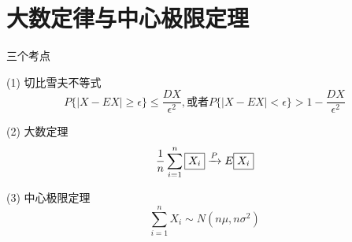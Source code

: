 \documentclass[12pt, a4paper, oneside, UTF8]{ctexbook}
\begin{document}
% 
\else
\fi

\chapter{大数定律与中心极限定理}
\begin{remark}
    三个考点
    \item[(1)] 切比雪夫不等式 
    \[
    P\{\left|X-EX\right|\geq\epsilon\}\leq \frac{DX}{\epsilon^2},
    \text{或者}P\{\left|X-EX\right| < \epsilon\}>1-\frac{DX}{\epsilon^2}
    \]
    \item[(2)] 大数定理 
    \[
    \frac{1}{n}\sum_{i=1}^{n}\fbox{$X_i$}\xrightarrow{P}E\fbox{$X_i$}
    \]
    \item[(3)] 中心极限定理
    \[
    \sum_{i=1}^{n}X_i\sim N(n\mu,n\sigma^2)
    \]
\end{remark}
\end{document}
